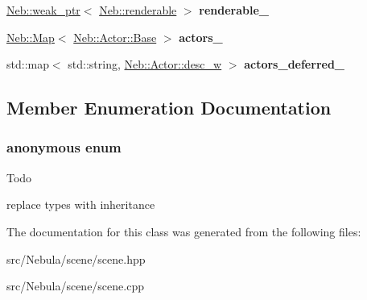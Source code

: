 \begin{DoxyCompactItemize}
\item 
\hypertarget{classNeb_1_1Scene_1_1scene_a81751dbac70743eb664dfcf51bc08415}{\hyperlink{classNeb_1_1weak__ptr}{\-Neb\-::weak\-\_\-ptr}$<$ \hyperlink{classNeb_1_1renderable}{\-Neb\-::renderable} $>$ {\bfseries renderable\-\_\-}}\label{classNeb_1_1Scene_1_1scene_a81751dbac70743eb664dfcf51bc08415}

\item 
\hypertarget{classNeb_1_1Scene_1_1scene_a34f0ddb235ae741113bbb9f00eb09bdd}{\hyperlink{classNeb_1_1Map}{\-Neb\-::\-Map}$<$ \hyperlink{classNeb_1_1Actor_1_1Base}{\-Neb\-::\-Actor\-::\-Base} $>$ {\bfseries actors\-\_\-}}\label{classNeb_1_1Scene_1_1scene_a34f0ddb235ae741113bbb9f00eb09bdd}

\item 
\hypertarget{classNeb_1_1Scene_1_1scene_a8c73edd38697448bac54460dc3bb877e}{std\-::map$<$ std\-::string, \*
\hyperlink{classNeb_1_1weak__ptr}{\-Neb\-::\-Actor\-::desc\-\_\-w} $>$ {\bfseries actors\-\_\-deferred\-\_\-}}\label{classNeb_1_1Scene_1_1scene_a8c73edd38697448bac54460dc3bb877e}

\end{DoxyCompactItemize}


\subsection{\-Member \-Enumeration \-Documentation}
\hypertarget{classNeb_1_1Scene_1_1scene_a5faf0bba7354d62e05bbfb7de1e79bf4}{\subsubsection[{anonymous enum}]{\setlength{\rightskip}{0pt plus 5cm}anonymous enum}}\label{classNeb_1_1Scene_1_1scene_a5faf0bba7354d62e05bbfb7de1e79bf4}
\begin{DoxyRefDesc}{\-Todo}
\item[{\bf \-Todo}]replace types with inheritance \end{DoxyRefDesc}


\-The documentation for this class was generated from the following files\-:\begin{DoxyCompactItemize}
\item 
src/\-Nebula/scene/scene.\-hpp\item 
src/\-Nebula/scene/scene.\-cpp\end{DoxyCompactItemize}
